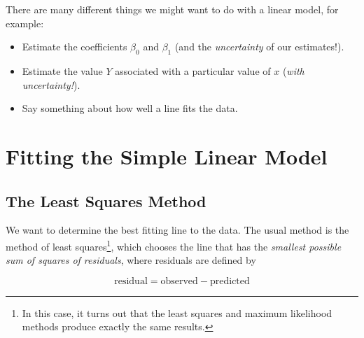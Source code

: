 \documentclass[twoside]{book}\usepackage[]{graphicx}\usepackage[]{xcolor}
\newcounter{example}[section]
\begin{document}
There are many different things we might want to do with a linear model, for example:
\begin{itemize}
	\item Estimate the coefficients $\beta_0$ and $\beta_1$ (and the \textit{uncertainty} of our estimates!).
	\item Estimate the value $Y$ associated with a particular value of $x$ (\textit{with uncertainty!}).
	\item Say something about how well a line fits the data.
\end{itemize}

\section{Fitting the Simple Linear Model}

\subsection{The Least Squares Method}

We want to determine the best fitting line to the data.  The usual method is 
the method of least squares\footnote{In this case, it turns out that the least 
squares and maximum likelihood methods produce exactly the same results.},
which chooses the line that has the 
\emph{ smallest possible sum of squares of residuals}, where residuals are defined by

\[
\mbox{residual} = \mbox{observed} - \mbox{predicted}
\]
\end{document}
